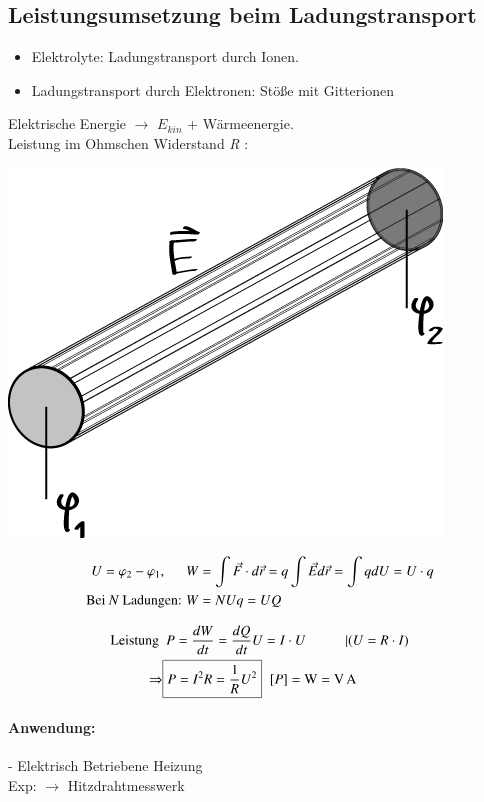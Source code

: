 \documentclass[11pt]{article}
\begin{document}
	\subsection{Leistungsumsetzung beim Ladungstransport}
	\begin{itemize}
		\item Elektrolyte: Ladungstransport durch Ionen.
		\item Ladungstransport durch Elektronen: Stöße mit Gitterionen
	\end{itemize}
	Elektrische Energie $ \longrightarrow $ $ E_{kin} $ + Wärmeenergie.\\
	Leistung im Ohmschen Widerstand \emph{R} :\\
	\begin{center}
		\includegraphics[width=0.4\linewidth]{skizzen/15/15_4-6/15_4B0}
	\end{center}

	\begin{align*}
	U = \varphi_2-\varphi_1,\hspace{5mm} W&=\int \vec{F} \cdot d\vec{r} = q \int\vec{E}d\vec{r} = \int q dU = U\cdot q  \\
	\text{Bei \emph{N} Ladungen: } W&=NUq=UQ  \\
	\end{align*}
	
	\begin{align*}
	\text{Leistung } &\text{ }P = \frac{dW}{dt} = \frac{dQ}{dt}U = I \cdot U \hspace{1cm} | (U=R\cdot I) \\
	\Rightarrow &\boxed{P = I^2R=\frac{1}{R} U^2 } \hspace{2mm} \text{[$ P $]}=\si{\watt}=\si{\volt\ampere}
	\end{align*}
	\paragraph{Anwendung:}
	- Elektrisch Betriebene Heizung \\
	Exp: $ \longrightarrow $ Hitzdrahtmesswerk 
	
\end{document}

